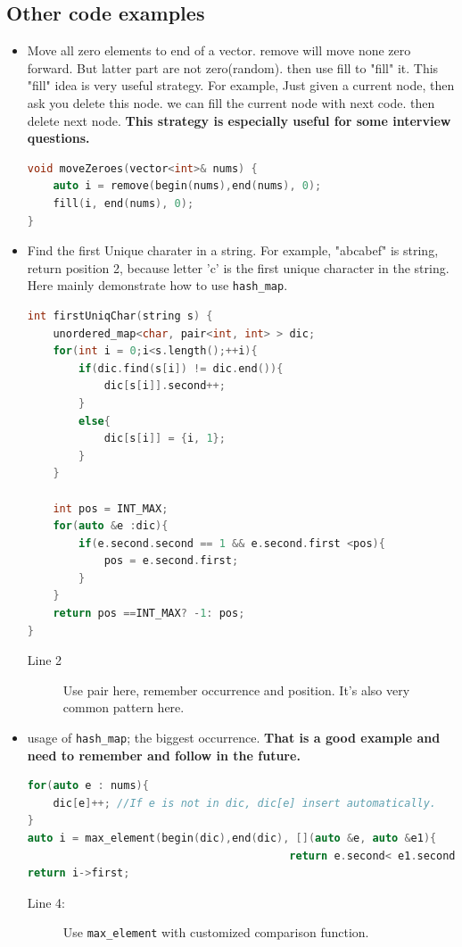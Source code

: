 \documentclass[a4paper,11pt,twoside]{book}
\begin{document}
\subsection{Other code examples}
\begin{itemize}
		
	\item Move all zero elements to end of a vector. remove will move none zero forward. But latter part are not zero(random). then use fill to "fill" it. This "fill" idea is very useful strategy. For example, Just given a current node, then ask you delete this node. we can fill the current node with next code. then delete next node. \textbf{This strategy is especially useful for some interview questions.} 
\begin{lstlisting}[frame=single, language=c++]	
void moveZeroes(vector<int>& nums) {
	auto i = remove(begin(nums),end(nums), 0);
	fill(i, end(nums), 0);
}	
\end{lstlisting}

\item Find the first Unique charater in a string. For example, "abcabef" is string, return position 2, because letter 'c' is the first unique character in the string. Here mainly demonstrate how to use \texttt{hash\_map}.
\begin{lstlisting}[frame=single, language=c++]	
int firstUniqChar(string s) {
	unordered_map<char, pair<int, int> > dic;
	for(int i = 0;i<s.length();++i){
		if(dic.find(s[i]) != dic.end()){
			dic[s[i]].second++;
		}
		else{
			dic[s[i]] = {i, 1};
		}
	}
	
	int pos = INT_MAX;
	for(auto &e :dic){
		if(e.second.second == 1 && e.second.first <pos){
			pos = e.second.first;
		}
	}
	return pos ==INT_MAX? -1: pos;
}
\end{lstlisting}
\begin{description}
	\item[Line 2] Use pair here, remember occurrence and position. It's also very common pattern here.	
\end{description}	


\item usage of \texttt{hash\_map}; the biggest occurrence. \textbf{That is a good example and need to remember and follow in the future.}
\begin{lstlisting}[frame=single, language=c++]	
for(auto e : nums){
	dic[e]++; //If e is not in dic, dic[e] insert automatically.
}
auto i = max_element(begin(dic),end(dic), [](auto &e, auto &e1){
	                                     return e.second< e1.second;});
return i->first;	
\end{lstlisting}
\begin{description}
	\item[Line 4:] Use \texttt{max\_element} with customized comparison function.	
\end{description}	
	

\end{itemize}
\end{document}
